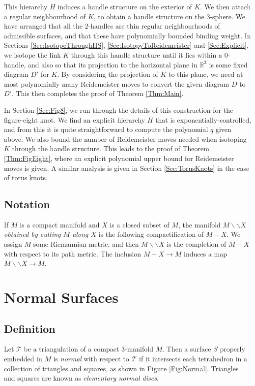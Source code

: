 \documentclass[oneside]{amsart}
\numberwithin{equation}{section}
\theoremstyle{plain}
\theoremstyle{definition}
\newcommand{\cut}{\backslash\backslash}
\begin{document}
This hierarchy $H$ induces a handle structure on the exterior of $K$. We then attach
a regular neighbourhood of $K$, to obtain a handle structure on the 3-sphere. We have arranged
that all the 2-handles are thin regular neighbourhoods of admissible surfaces, and that these have
polynomially bounded binding weight. In Sections \ref{Sec:IsotopeThroughHS}, \ref{Sec:IsotopyToReidemeister} and \ref{Sec:Explicit}, we isotope the
link $K$ through this handle structure until it lies within a 0-handle, and also so that its projection
to the horizontal plane in $\mathbb{R}^3$ is some fixed diagram $D'$ for $K$. By considering
the projection of $K$ to this plane, we need at most polynomially many Reidemeister moves to
convert the given diagram $D$ to $D'$. This then completes the proof of Theorem \ref{Thm:Main}.

In Section \ref{Sec:Fig8}, we run through the details of this construction for the figure-eight knot.
We find an explicit hierarchy $H$ that is exponentially-controlled, and from this it is quite straightforward
to compute the polynomial $q$ given above. We also bound the number of Reidemeister moves
needed when isotoping $K$ through the handle structure. This leads to the proof of Theorem
\ref{Thm:FigEight}, where an explicit polynomial upper bound for Reidemeister moves is given.
A similar analysis is given in Section \ref{Sec:TorusKnots} in the case of torus knots.









\subsection{Notation} If $M$ is a compact manifold and $X$ is a closed subset of $M$, the manifold $M \backslash \backslash X$
\emph{obtained by cutting $M$ along $X$} is the following compactification of $M - X$. We assign $M$ some Riemannian metric,
and then $M \cut X$ is the completion of $M - X$ with respect to its path metric. The inclusion
$M -X \rightarrow M$ induces a map $M \backslash \backslash X \rightarrow M$.

\section{Normal Surfaces}
\label{Sec:NormalSurfaces}

\subsection{Definition}
Let $\mathcal{T}$ be a triangulation of a compact 3-manifold $M$. Then a surface $S$ properly embedded in $M$ is \emph{normal} with respect to $\mathcal{T}$ if it intersects each tetrahedron in a collection of triangles and squares, as shown in Figure \ref{Fig:Normal}. Triangles and squares are known as \emph{elementary normal discs}.
\end{document}
